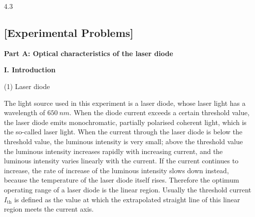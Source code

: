 \begin{figbox}{4.3}
\end{figbox}

\subsection*{[Experimental Problems]}

\textbf{Part A: Optical characteristics of the laser diode}

\noindent\textbf{I. Introduction}

(1) Laser diode

The light source used in this experiment is a laser diode, whose laser light has a wavelength of $\SI{650}{nm}$. When the diode current exceeds a certain threshold value, the laser diode emits monochromatic, partially polarised coherent light, which is the so-called laser light. When the current through the laser diode is below the threshold value, the luminous intensity is very small; above the threshold value the luminous intensity increases rapidly with increasing current, and the luminous intensity varies linearly with the current. If the current continues to increase, the rate of increase of the luminous intensity slows down instead, because the temperature of the laser diode itself rises. Therefore the optimum operating range of a laser diode is the linear region. Usually the threshold current $I_{\mathrm{th}}$ is defined as the value at which the extrapolated straight line of this linear region meets the current axis.

